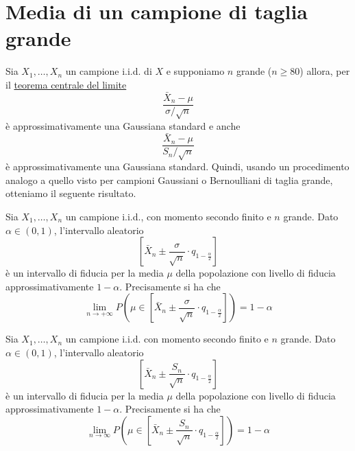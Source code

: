 \section{Media di un campione di taglia grande}
Sia $X_1, \dots, X_n$ un campione i.i.d. di $X$ e supponiamo $n$ grande ($n \geq 80$) allora, per
il \hyperref[th: tlc]{teorema centrale del limite}
\[ \frac{\bar{X}_n - \mu}{\sigma / \sqrt{n}} \]
è approssimativamente una Gaussiana standard e anche
\[ \frac{\bar{X}_n - \mu}{S_n / \sqrt{n}} \]
è approssimativamente una Gaussiana standard. Quindi, usando un procedimento analogo a quello visto
per campioni Gaussiani o Bernoulliani di taglia grande, otteniamo il seguente risultato.

\begin{proposition}
	Sia $X_1, \dots, X_n$ un campione i.i.d., con momento secondo finito e $n$ grande. Dato
	$\alpha \in (0,1)$, l'intervallo aleatorio
	\[ \left[ \bar{X}_n \pm \frac{\sigma}{\sqrt{n}} \cdot q_{1 - \frac{\alpha}{2}} \right] \]
	è un intervallo di fiducia per la media $\mu$ della popolazione con livello di fiducia
	approssimativamente $1 - \alpha$. Precisamente si ha che
	\[
		\lim_{n \to +\infty} P \left( \mu \in \left[
			\bar{X}_n \pm \frac{\sigma}{\sqrt{n}} \cdot q_{1 - \frac{\alpha}{2}}
			\right] \right) = 1 - \alpha
	\]
\end{proposition}

\begin{proposition}
	Sia $X_1, \dots, X_n$ un campione i.i.d. con momento secondo finito e $n$ grande. Dato
	$\alpha \in (0,1)$, l'intervallo aleatorio
	\[ \left[ \bar{X}_n \pm \frac{S_n}{\sqrt{n}} \cdot q_{1 - \frac{\alpha}{2}} \right] \]
	è un intervallo di fiducia per la media $\mu$ della popolazione con livello di fiducia
	approssimativamente $1-\alpha$. Precisamente si ha che
	\[
		\lim_{n \to \infty} P \left( \mu \in \left[
			\bar{X}_n \pm \frac{S_n}{\sqrt{n}} \cdot q_{1 - \frac{\alpha}{2}}
			\right] \right) = 1 - \alpha
	\]
\end{proposition}
